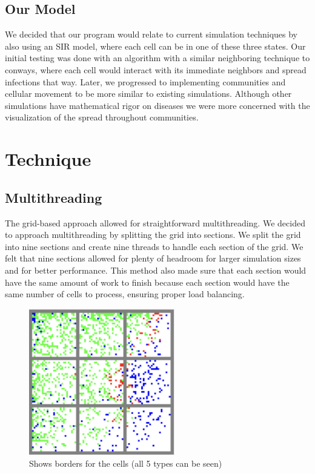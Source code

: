 \documentclass[conference]{IEEEtran}
\begin{document}
\subsection{Our Model}

We decided that our program would relate to current simulation techniques by also using an SIR model, where each cell can be in one of these three states. Our initial testing was done with an algorithm with a similar neighboring technique to conways, where each cell would interact with its immediate neighbors and spread infections that way. Later, we progressed to implementing communities and cellular movement to be more similar to existing simulations. Although other simulations have mathematical rigor on diseases \cite{b3} we were more concerned with the visualization of the spread throughout communities.

\section{Technique}

\subsection{Multithreading}

The grid-based approach allowed for straightforward multithreading. We decided to approach multithreading by splitting the grid into sections. We split the grid into nine sections and create nine threads to handle each section of the grid. We felt that nine sections allowed for plenty of headroom for larger simulation sizes and for better performance. This method also made sure that each section would have the same amount of work to finish because each section would have the same number of cells to process, ensuring proper load balancing. 

\begin{figure}[!hbt]
\centering
\includegraphics[width=2.5in]{Figures/Bordered Screenshot.png}
\caption{Shows borders for the cells (all 5 types can be seen) }
\label{fig_sim}
\end{figure}
\end{document}
